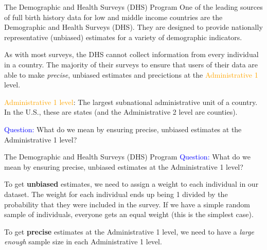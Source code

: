 \documentclass[10pt,t]{beamer}
\begin{document}
\begin{frame}{The Demographic and Health Surveys (DHS) Program}
One of the leading sources of full birth history data for low and middle income countries are the Demographic and Health Surveys (DHS). They are designed to provide nationally representative (unbiased) estimates for a variety of demographic indicators. 

\vspace{0.3cm}

As with most surveys, the DHS cannot collect information from every individual in a country. The majority of their surveys to ensure that users of their data are able to make \textit{precise}, unbiased estimates and precictions at the \textcolor{orange}{Administrative 1} level.

\vspace{0.3cm}

\textcolor{orange}{Administrative 1 level}: The largest subnational administrative unit of a country. In the U.S., these are states (and the Administrative 2 level are counties).

\vspace{0.3cm}

\textcolor{blue}{Question:} What do we mean by ensuring precise, unbiased estimates at the Administrative 1 level?

\end{frame}

\begin{frame}{The Demographic and Health Surveys (DHS) Program}
\textcolor{blue}{Question:} What do we mean by ensuring precise, unbiased estimates at the Administrative 1 level?

\vspace{0.3cm}

To get \textbf{unbiased} estimates, we need to assign a weight to each individual in our dataset. The weight for each individual ends up being 1 divided by the probability that they were included in the survey. If we have a simple random sample of individuals, everyone gets an equal weight (this is the simplest case).

\vspace{0.3cm}

To get \textbf{precise} estimates at the Administrative 1 level, we need to have a \textit{large enough} sample size in each Administrative 1 level.

\end{frame}
\end{document}
